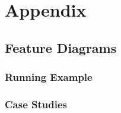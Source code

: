 \appendix
\chapter{Appendix}
\label{appendix}

\section{Feature Diagrams}
\label{feature_diagrams}

\subsection{Running Example}



\subsection{Case Studies}



